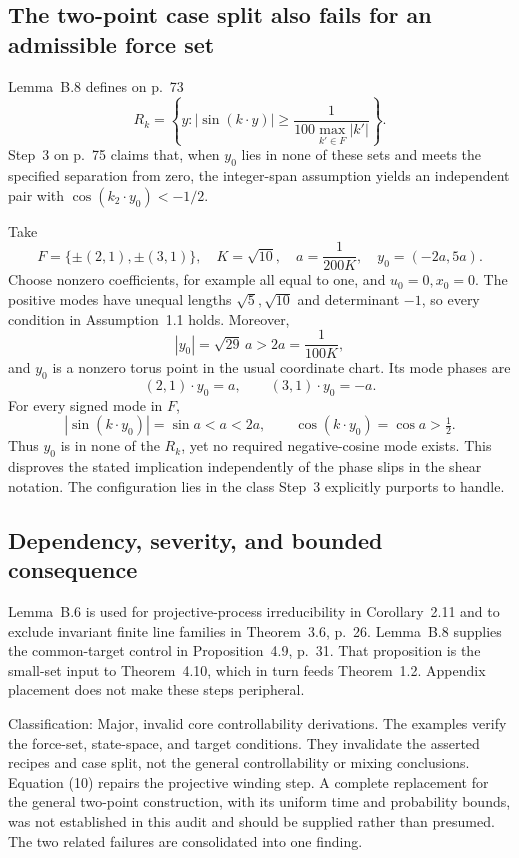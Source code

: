 \documentclass[10pt]{article}
\begin{document}
\subsection*{The two-point case split also fails for an admissible force set}
Lemma B.8 defines on p. 73 \[R_k=\left\{y:|\sin(k\cdot y)|
       \ge\frac1{100\max_{k'\in F}|k'|}\right\}.\] Step 3 on p. 75 claims that, when \(y_0\) lies in none of these sets and meets the specified separation from zero, the integer-span assumption yields an independent pair with \(\cos(k_2\cdot y_0)<-1/2\).\par
Take \[F=\{\pm(2,1),\pm(3,1)\},\quad
 K=\sqrt{10},\quad a=\frac1{200K},\quad y_0=(-2a,5a).
 \tag{11}\] Choose nonzero coefficients, for example all equal to one, and \(u_0=0,x_0=0\). The positive modes have unequal lengths \(\sqrt5,\sqrt{10}\) and determinant \(-1\), so every condition in Assumption 1.1 holds. Moreover, \[|y_0|=\sqrt{29}\,a>2a=\frac1{100K},\] and \(y_0\) is a nonzero torus point in the usual coordinate chart. Its mode phases are \[(2,1)\cdot y_0=a,\qquad (3,1)\cdot y_0=-a.\] For every signed mode in \(F\), \[|\sin(k\cdot y_0)|=\sin a<a<2a,
 \qquad \cos(k\cdot y_0)=\cos a>\tfrac12.
 \tag{12}\] Thus \(y_0\) is in none of the \(R_k\), yet no required negative-cosine mode exists. This disproves the stated implication independently of the phase slips in the shear notation. The configuration lies in the class Step 3 explicitly purports to handle.\par
\subsection*{Dependency, severity, and bounded consequence}
Lemma B.6 is used for projective-process irreducibility in Corollary 2.11 and to exclude invariant finite line families in Theorem 3.6, p. 26. Lemma B.8 supplies the common-target control in Proposition 4.9, p. 31. That proposition is the small-set input to Theorem 4.10, which in turn feeds Theorem 1.2. Appendix placement does not make these steps peripheral.\par
Classification: Major, invalid core controllability derivations. The examples verify the force-set, state-space, and target conditions. They invalidate the asserted recipes and case split, not the general controllability or mixing conclusions. Equation (10) repairs the projective winding step. A complete replacement for the general two-point construction, with its uniform time and probability bounds, was not established in this audit and should be supplied rather than presumed. The two related failures are consolidated into one finding.\par
\end{document}
